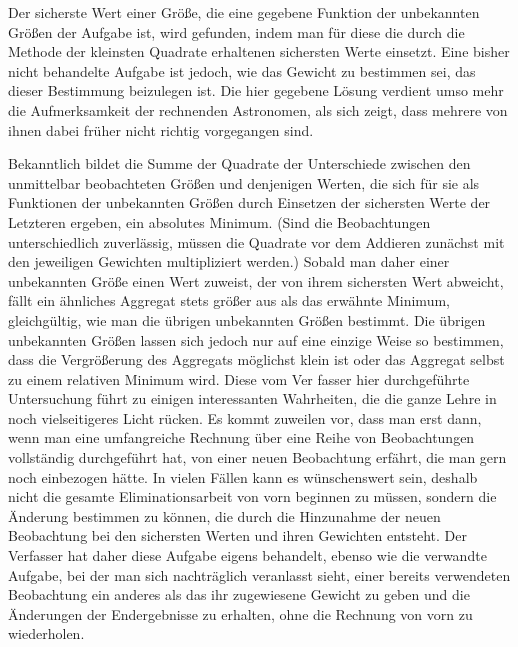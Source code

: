 Der sicherste Wert einer Größe, die eine gegebene Funktion der unbekannten Größen der Aufgabe ist, wird gefunden, indem man für diese die durch die Methode der kleinsten Quadrate erhaltenen sichersten Werte einsetzt. Eine bisher nicht behandelte Aufgabe ist jedoch, wie das Gewicht zu bestimmen sei, das dieser Bestimmung beizulegen ist. Die hier gegebene Lösung verdient umso mehr die Aufmerksamkeit der rechnenden Astronomen, als sich zeigt, dass mehrere von ihnen dabei früher nicht richtig vorgegangen sind.

Bekanntlich bildet die Summe der Quadrate der Unterschiede zwischen den unmittelbar beobachteten Größen und denjenigen Werten, die sich für sie als Funktionen der unbekannten Größen durch Einsetzen der sichersten Werte der Letzteren ergeben, ein absolutes Minimum. (Sind die Beobachtungen unterschiedlich zuverlässig, müssen die Quadrate vor dem Addieren zunächst mit den jeweiligen Gewichten multipliziert werden.) Sobald man daher einer unbekannten Größe einen Wert zuweist, der von ihrem sichersten Wert abweicht, fällt ein ähnliches Aggregat stets größer aus als das erwähnte Minimum, gleichgültig, wie man die übrigen unbekannten Größen bestimmt. Die übrigen unbekannten Größen lassen sich jedoch nur auf eine einzige Weise so bestimmen, dass die Vergrößerung des Aggregats möglichst klein ist oder das Aggregat selbst zu einem relativen Minimum wird. Diese vom Ver%
fasser hier durchgeführte Untersuchung führt zu einigen interessanten Wahrheiten, die die ganze Lehre in noch vielseitigeres Licht rücken.
Es kommt zuweilen vor, dass man erst dann, wenn man eine umfangreiche Rechnung über eine Reihe von Beobachtungen vollständig durchgeführt hat, von einer neuen Beobachtung erfährt, die man gern noch einbezogen hätte. In vielen Fällen kann es wünschenswert sein, deshalb nicht die gesamte Eliminationsarbeit von vorn beginnen zu müssen, sondern die Änderung bestimmen zu können, die durch die Hinzunahme der neuen Beobachtung bei den sichersten Werten und ihren Gewichten entsteht. Der Verfasser hat daher diese Aufgabe eigens behandelt, ebenso wie die verwandte Aufgabe, bei der man sich nachträglich veranlasst sieht, einer bereits verwendeten Beobachtung ein anderes als das ihr zugewiesene Gewicht zu geben und die Änderungen der Endergebnisse zu erhalten, ohne die Rechnung von vorn zu wiederholen.

